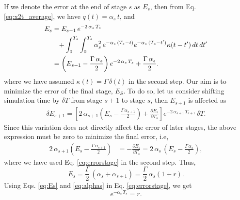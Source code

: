 \documentclass[reprint, superscriptaddress, floatfix]{revtex4-1}
\begin{document}
If we denote the error at the end of stage $s$ as $E_s$,
then from Eq. \eqref{eq:x2t_average}, we have
$q(t) = \alpha_s \, t$, and
%
\begin{align}
  E_s
  &=
  E_{s - 1} \, e^{-2 \, \alpha_s \, T_s }
  \notag\\
  &\phantom{=}
  +
  \int_0^{T_s} \int_0^{T_s}
  \alpha_s^2 \,
  e^{ -\alpha_s \, (T_s - t) }
  e^{ -\alpha_s \, (T_s - t') }
  \kappa( t - t' ) \, dt \, dt'
  \notag
  \\
  &=
  \left(
    E_{s - 1} - \frac{ \Gamma \, \alpha_s } { 2 }
  \right)
  e^{ - 2 \, \alpha_s \, T_s }
  +
  \frac{ \Gamma \, \alpha_s } { 2 }
  .
  \label{eq:errorstage}
\end{align}
%
where we have assumed
$\kappa(t) = \Gamma \, \delta(t)$
in the second step.
%
Our aim is to minimize the error
of the final stage, $E_S$.
%
To do so, let us consider shifting simulation time
by $\delta T$ from
stage $s+1$ to stage $s$,
then $E_{s+1}$ is affected as
%
\begin{align*}
  \delta E_{s+1}
  =
\left[
  2 \, \alpha_{s+1}
  \left(
    E_s - \tfrac{ \Gamma \, \alpha_{s+1} } { 2 }
  \right)
  +
  \frac{ \partial E_s } { \partial T_s }
\right]
e^{-2 \, \alpha_{s+1} \, T_{s+1} }
\,
\delta T
.
\end{align*}
%
Since this variation does not directly affect the error of later stages,
the above expression must be zero to minimize the final error, i.e,
%
\begin{align*}
  2 \, \alpha_{s+1}
  \left(
    E_s - \frac{ \Gamma \, \alpha_{s+1} } { 2 }
  \right)
  &=
  -\frac{ \partial E_s } { \partial T_s }
  =
  2 \, \alpha_s \, \left(E_s - \frac{ \Gamma \, \alpha_s } { 2 }  \right)
  ,
\end{align*}
%
where we have used Eq. \eqref{eq:errorstage}
in the second step.
%
Thus,
\begin{equation}
  E_s
  =
  \frac{ \Gamma } { 2 } \, ( \alpha_s + \alpha_{s+1} )
  =
  \frac{ \Gamma } { 2 } \, \alpha_s ( 1 + r )
  .
  \label{eq:Es}
\end{equation}
%
Using Eqs. \eqref{eq:Es} and \eqref{eq:alphas}
in Eq. \eqref{eq:errorstage}, we get
%
\begin{equation}
  e^{-\alpha_s \, T_s } = r
  .
  \label{eq:exp_r}
\end{equation}
%
\end{document}

